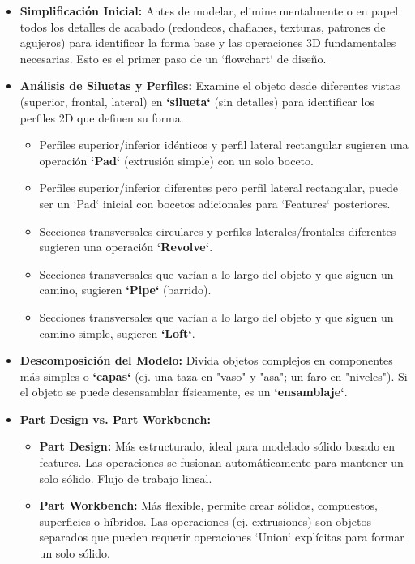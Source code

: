 \documentclass[12pt]{article}
\begin{document}
\begin{itemize}[label=\textbullet]
    \item \textbf{Simplificación Inicial:} Antes de modelar, elimine mentalmente o en papel todos los detalles de acabado (redondeos, chaflanes, texturas, patrones de agujeros) para identificar la forma base y las operaciones 3D fundamentales necesarias. Esto es el primer paso de un `flowchart` de diseño.
    \item \textbf{Análisis de Siluetas y Perfiles:} Examine el objeto desde diferentes vistas (superior, frontal, lateral) en \textbf{`silueta`} (sin detalles) para identificar los perfiles 2D que definen su forma.
    \begin{itemize}[label=\textendash]
        \item Perfiles superior/inferior idénticos y perfil lateral rectangular sugieren una operación \textbf{`Pad`} (extrusión simple) con un solo boceto.
        \item Perfiles superior/inferior diferentes pero perfil lateral rectangular, puede ser un `Pad` inicial con bocetos adicionales para `Features` posteriores.
        \item Secciones transversales circulares y perfiles laterales/frontales diferentes sugieren una operación \textbf{`Revolve`}.
        \item Secciones transversales que varían a lo largo del objeto y que siguen un camino, sugieren \textbf{`Pipe`} (barrido).
        \item Secciones transversales que varían a lo largo del objeto y que siguen un camino simple, sugieren \textbf{`Loft`}.
    \end{itemize}
    \item \textbf{Descomposición del Modelo:} Divida objetos complejos en componentes más simples o \textbf{`capas`} (ej. una taza en "vaso" y "asa"; un faro en "niveles"). Si el objeto se puede desensamblar físicamente, es un \textbf{`ensamblaje`}.
    \item \textbf{Part Design vs. Part Workbench:}
    \begin{itemize}[label=\textendash]
        \item \textbf{Part Design:} Más estructurado, ideal para modelado sólido basado en features. Las operaciones se fusionan automáticamente para mantener un solo sólido. Flujo de trabajo lineal.
        \item \textbf{Part Workbench:} Más flexible, permite crear sólidos, compuestos, superficies o híbridos. Las operaciones (ej. extrusiones) son objetos separados que pueden requerir operaciones `Union` explícitas para formar un solo sólido.

\end{itemize}
\end{itemize}
\end{document}
